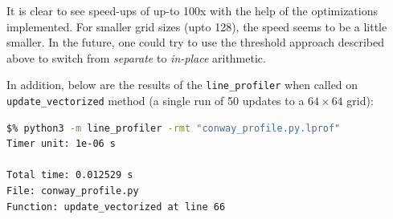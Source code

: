 \documentclass[a4paper,12pt]{article}
\begin{document}
It is clear to see speed-ups of up-to 100x with the help of the optimizations implemented. For smaller grid sizes (upto 128), the speed seems to be a little smaller. In the future, one could try to use the threshold approach described above to switch from \textit{separate} to \textit{in-place} arithmetic. 

In addition, below are the results of the \verb|line_profiler| when called on \verb|update_vectorized| method (a single run of 50 updates to a $64 \times 64$ grid): 

\begin{lstlisting}[language=bash,basicstyle=\tiny\ttfamily]
$% python3 -m line_profiler -rmt "conway_profile.py.lprof"
Timer unit: 1e-06 s

Total time: 0.012529 s
File: conway_profile.py
Function: update_vectorized at line 66


\end{lstlisting}
\end{document}
